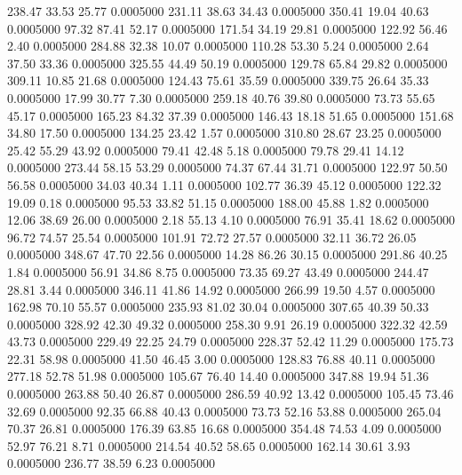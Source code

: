  238.47   33.53   25.77   0.0005000
 231.11   38.63   34.43   0.0005000
 350.41   19.04   40.63   0.0005000
  97.32   87.41   52.17   0.0005000
 171.54   34.19   29.81   0.0005000
 122.92   56.46    2.40   0.0005000
 284.88   32.38   10.07   0.0005000
 110.28   53.30    5.24   0.0005000
   2.64   37.50   33.36   0.0005000
 325.55   44.49   50.19   0.0005000
 129.78   65.84   29.82   0.0005000
 309.11   10.85   21.68   0.0005000
 124.43   75.61   35.59   0.0005000
 339.75   26.64   35.33   0.0005000
  17.99   30.77    7.30   0.0005000
 259.18   40.76   39.80   0.0005000
  73.73   55.65   45.17   0.0005000
 165.23   84.32   37.39   0.0005000
 146.43   18.18   51.65   0.0005000
 151.68   34.80   17.50   0.0005000
 134.25   23.42    1.57   0.0005000
 310.80   28.67   23.25   0.0005000
  25.42   55.29   43.92   0.0005000
  79.41   42.48    5.18   0.0005000
  79.78   29.41   14.12   0.0005000
 273.44   58.15   53.29   0.0005000
  74.37   67.44   31.71   0.0005000
 122.97   50.50   56.58   0.0005000
  34.03   40.34    1.11   0.0005000
 102.77   36.39   45.12   0.0005000
 122.32   19.09    0.18   0.0005000
  95.53   33.82   51.15   0.0005000
 188.00   45.88    1.82   0.0005000
  12.06   38.69   26.00   0.0005000
   2.18   55.13    4.10   0.0005000
  76.91   35.41   18.62   0.0005000
  96.72   74.57   25.54   0.0005000
 101.91   72.72   27.57   0.0005000
  32.11   36.72   26.05   0.0005000
 348.67   47.70   22.56   0.0005000
  14.28   86.26   30.15   0.0005000
 291.86   40.25    1.84   0.0005000
  56.91   34.86    8.75   0.0005000
  73.35   69.27   43.49   0.0005000
 244.47   28.81    3.44   0.0005000
 346.11   41.86   14.92   0.0005000
 266.99   19.50    4.57   0.0005000
 162.98   70.10   55.57   0.0005000
 235.93   81.02   30.04   0.0005000
 307.65   40.39   50.33   0.0005000
 328.92   42.30   49.32   0.0005000
 258.30    9.91   26.19   0.0005000
 322.32   42.59   43.73   0.0005000
 229.49   22.25   24.79   0.0005000
 228.37   52.42   11.29   0.0005000
 175.73   22.31   58.98   0.0005000
  41.50   46.45    3.00   0.0005000
 128.83   76.88   40.11   0.0005000
 277.18   52.78   51.98   0.0005000
 105.67   76.40   14.40   0.0005000
 347.88   19.94   51.36   0.0005000
 263.88   50.40   26.87   0.0005000
 286.59   40.92   13.42   0.0005000
 105.45   73.46   32.69   0.0005000
  92.35   66.88   40.43   0.0005000
  73.73   52.16   53.88   0.0005000
 265.04   70.37   26.81   0.0005000
 176.39   63.85   16.68   0.0005000
 354.48   74.53    4.09   0.0005000
  52.97   76.21    8.71   0.0005000
 214.54   40.52   58.65   0.0005000
 162.14   30.61    3.93   0.0005000
 236.77   38.59    6.23   0.0005000
